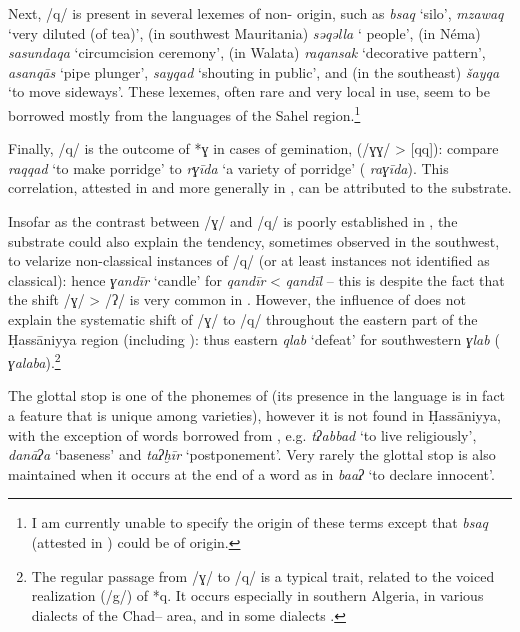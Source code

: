 \documentclass[output=paper]{langsci/langscibook}
\begin{document}
Next, /q/ is present in several lexemes of non- origin, such as \textit{bsaq} ‘silo’, \textit{mzaw{\R}aq} ‘very diluted (of tea)’, (in southwest Mauritania) \textit{sə{\R}qəlla} ‘ people’, (in Néma) \textit{sasundaqa} ‘circumcision ceremony’, (in Walata) \textit{raqansak} ‘decorative pattern’, \textit{asanqās} ‘pipe plunger’, \textit{sayqad} ‘shouting in public’, and (in the southeast) \textit{šayqa} ‘to move sideways’. These lexemes, often rare and very local in use, seem to be borrowed mostly from the languages of the Sahel region.\footnote{I am currently unable to specify the origin of these terms except that \textit{bsaq} (attested in ) could be of  origin.}

Finally, /q/ is the outcome of *ɣ in cases of gemination, (/ɣɣ/ > [qq]): compare \textit{raqqad} ‘to make porridge’ to \textit{rɣīda} ‘a variety of porridge’ ( \textit{raɣīda}). This correlation, attested in  and more generally in , can be attributed to the {substrate}.

Insofar as the contrast between /ɣ/ and /q/ is poorly established in , the {substrate} could also explain the tendency, sometimes observed in the southwest, to velarize non-classical instances of /q/ (or at least instances not identified as classical): hence \textit{ɣandīr} ‘candle’ for \textit{qandīr} <  \textit{qandīl} – this is despite the fact that the shift /ɣ/ > /ʔ/ is very common in . However, the influence of  does not explain the systematic shift of /ɣ/ to /q/ throughout the eastern part of the Ḥassāniyya region (including ): thus eastern \textit{qlab} ‘defeat’ for southwestern \textit{ɣlab} ( \textit{ɣalaba}).\footnote{The regular passage from /ɣ/ to /q/ is a typical  trait, related to the voiced realization (/g/) of *q. It occurs especially in southern Algeria, in various dialects of the Chad– area, and in some  dialects \citep[72]{Cantineau1960book}.}

The glottal stop is one of the phonemes of  (its presence in the language is in fact a feature that is unique among  varieties), however it is not found in Ḥassāniyya, with the exception of words borrowed from  , e.g. \textit{tʔabbad} ‘to live religiously’, \textit{danāʔa} ‘baseness’ and \textit{taʔḫīr} ‘postponement’. Very rarely the glottal stop is also maintained when it occurs at the end of a word as in \textit{ba{\R}{\R}aʔ} ‘to declare innocent’.
\end{document}
